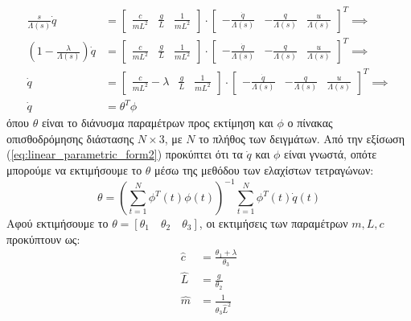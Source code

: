 \documentclass[a4paper,12pt]{article}
\begin{document}
\begin{equation}
\begin{aligned}
    \frac{s}{\Lambda(s)}\dot{q} &=
    \left[
    \begin{matrix}
        \frac{c}{mL^2} & \frac{g}{L} & \frac{1}{mL^2}
    \end{matrix}
    \right]
    \cdot
    \left[
    \begin{matrix}
        -\frac{\dot{q}}{\Lambda(s)} & -\frac{q}{\Lambda(s)} & \frac{u}{\Lambda(s)}
    \end{matrix}
    \right]^T 
    \implies \\
    \left(1 - \frac{\lambda}{\Lambda(s)}\right)\dot{q} &=
    \left[
    \begin{matrix}
        \frac{c}{mL^2} & \frac{g}{L} & \frac{1}{mL^2}
    \end{matrix}
    \right]
    \cdot
    \left[
    \begin{matrix}
        -\frac{\dot{q}}{\Lambda(s)} & -\frac{q}{\Lambda(s)} & \frac{u}{\Lambda(s)}
    \end{matrix}
    \right]^T
    \implies \\
    \dot{q} &=
    \left[
    \begin{matrix}
        \frac{c}{mL^2}-\lambda & \frac{g}{L} & \frac{1}{mL^2}
    \end{matrix}
    \right]
    \cdot
    \left[
    \begin{matrix}
        -\frac{\dot{q}}{\Lambda(s)} & -\frac{q}{\Lambda(s)} & \frac{u}{\Lambda(s)}
    \end{matrix}
    \right]^T
    \implies \\
    \dot{q} &= \theta^T \phi
    \label{eq:linear_parametric_form2}   
\end{aligned}
\end{equation}
όπου $\theta$ είναι το διάνυσμα παραμέτρων προς εκτίμηση και $\phi$ ο πίνακας οπισθοδρόμησης διάστασης $N \times 3$, με $N$ το πλήθος των δειγμάτων. Από την εξίσωση (\ref{eq:linear_parametric_form2}) προκύπτει ότι τα $\dot{q}$ και $\phi$ είναι γνωστά, οπότε μπορούμε να εκτιμήσουμε το $\theta$ μέσω της μεθόδου των ελαχίστων τετραγώνων:
\begin{equation}
    \theta = \left(\sum_{t=1}^N\phi^T(t)\phi(t)\right)^{-1}\sum_{t=1}^N\phi^T(t)\dot{q}(t)
\end{equation}
Αφού εκτιμήσουμε το $\theta = [\theta_1 \quad \theta_2 \quad \theta_3]$, οι εκτιμήσεις των παραμέτρων $m, L, c$ προκύπτουν ως:
\begin{equation}
    \begin{aligned}
        \hat{c} &= \frac{\theta_1 + \lambda}{\theta_3} \\
        \hat{L} &= \frac{g}{\theta_2} \\
        \hat{m} &= \frac{1}{\theta_3 \hat{L}^2}
    \end{aligned}
\end{equation}
\end{document}
